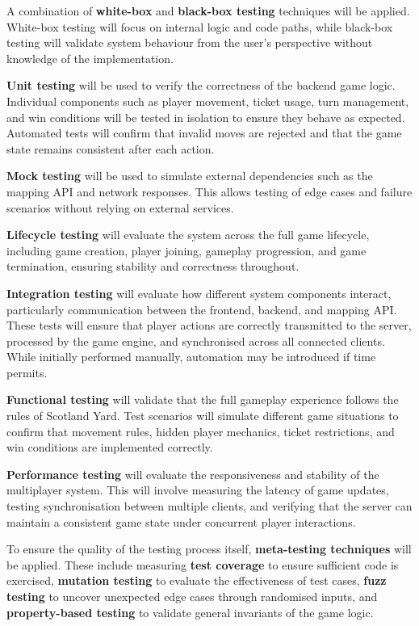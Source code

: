 \documentclass[11pt, a4paper, twoside, openright]{article}
\begin{document}
	A combination of \textbf{white-box} and \textbf{black-box testing} techniques will be applied. White-box testing will focus on internal logic and code paths, while black-box testing will validate system behaviour from the user’s perspective without knowledge of the implementation.
	
	\textbf{Unit testing} will be used to verify the correctness of the backend game logic. Individual components such as player movement, ticket usage, turn management, and win conditions will be tested in isolation to ensure they behave as expected. Automated tests will confirm that invalid moves are rejected and that the game state remains consistent after each action.
	
	\textbf{Mock testing} will be used to simulate external dependencies such as the mapping API and network responses. This allows testing of edge cases and failure scenarios without relying on external services.
	
	\textbf{Lifecycle testing} will evaluate the system across the full game lifecycle, including game creation, player joining, gameplay progression, and game termination, ensuring stability and correctness throughout.
	
	\textbf{Integration testing} will evaluate how different system components interact, particularly communication between the frontend, backend, and mapping API. These tests will ensure that player actions are correctly transmitted to the server, processed by the game engine, and synchronised across all connected clients. While initially performed manually, automation may be introduced if time permits.
	
	\textbf{Functional testing} will validate that the full gameplay experience follows the rules of Scotland Yard. Test scenarios will simulate different game situations to confirm that movement rules, hidden player mechanics, ticket restrictions, and win conditions are implemented correctly.
	
	\textbf{Performance testing} will evaluate the responsiveness and stability of the multiplayer system. This will involve measuring the latency of game updates, testing synchronisation between multiple clients, and verifying that the server can maintain a consistent game state under concurrent player interactions.
	
	To ensure the quality of the testing process itself, \textbf{meta-testing techniques} will be applied. These include measuring \textbf{test coverage} to ensure sufficient code is exercised, \textbf{mutation testing} to evaluate the effectiveness of test cases, \textbf{fuzz testing} to uncover unexpected edge cases through randomised inputs, and \textbf{property-based testing} to validate general invariants of the game logic.
	
\end{document}

